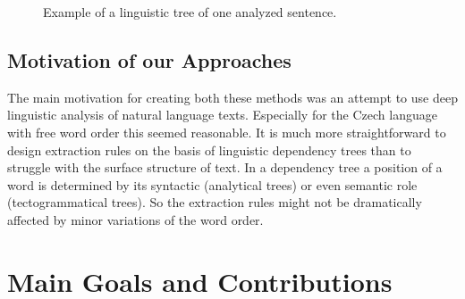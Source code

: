 \begin{figure}
\centerline{}
\caption{Example of a linguistic tree of one analyzed sentence.}
\label{fig:intro_damage_tree} 
\end{figure}


\subsection{Motivation of our Approaches}

The main motivation for creating both these methods was an attempt to use deep linguistic analysis of natural language texts. Especially for the Czech language with free word order this seemed reasonable. It is much more straightforward to design extraction rules on the basis of linguistic dependency trees than to struggle with the surface structure of text. In a dependency tree a position of a word is determined by its syntactic (analytical trees) or even semantic role (tectogrammatical trees). So the extraction rules might not be dramatically affected by minor variations of the word order.





\section{Main Goals and Contributions}

